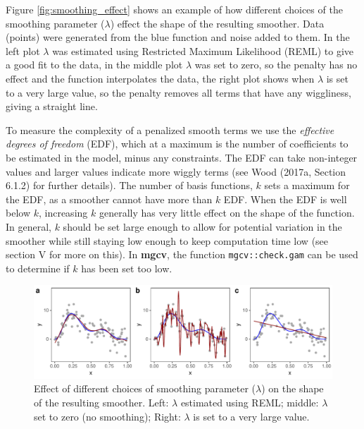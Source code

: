 \documentclass[12pt]{article}
\begin{document}
Figure \ref{fig:smoothing_effect} shows an example of how different
choices of the smoothing parameter (\(\lambda\)) effect the shape of the
resulting smoother. Data (points) were generated from the blue function
and noise added to them. In the left plot \(\lambda\) was estimated
using Restricted Maximum Likelihood (REML) to give a good fit to the
data, in the middle plot \(\lambda\) was set to zero, so the penalty has
no effect and the function interpolates the data, the right plot shows
when \(\lambda\) is set to a very large value, so the penalty removes
all terms that have any wiggliness, giving a straight line.

To measure the complexity of a penalized smooth terms we use the
\emph{effective degrees of freedom} (EDF), which at a maximum is the
number of coefficients to be estimated in the model, minus any
constraints. The EDF can take non-integer values and larger values
indicate more wiggly terms (see Wood (2017a, Section 6.1.2) for further
details). The number of basis functions, \(k\) sets a maximum for the
EDF, as a smoother cannot have more than \(k\) EDF. When the EDF is well
below \(k\), increasing \(k\) generally has very little effect on the
shape of the function. In general, \(k\) should be set large enough to
allow for potential variation in the smoother while still staying low
enough to keep computation time low (see section V for more on this). In
\textbf{mgcv}, the function \texttt{mgcv::check.gam} can be used to
determine if \(k\) has been set too low.

\begin{figure}
\includegraphics[width=\linewidth]{../figures/lambda-1} \caption{\label{fig:smoothing_effect}Effect of different choices of smoothing parameter ($\lambda$) on the shape of the resulting smoother. Left:  $\lambda$ estimated using REML; middle: $\lambda$ set to zero (no smoothing); Right: $\lambda$ is set to a very large value.}\label{fig:lambda}
\end{figure}
\end{document}
